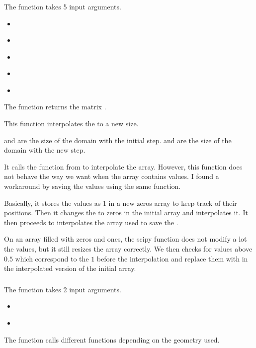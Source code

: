 \subsubsection{}
The function \textcolor{func}{} takes 5 input arguments.
\begin{itemize}
      \item {} \textcolor{dtype}{}
      \item {} \textcolor{dtype}{}
      \item {} \textcolor{dtype}{}
      \item {} \textcolor{dtype}{}
      \item {} \textcolor{dtype}{}
\end{itemize}
The function returns the matrix .

This function interpolates the  to a new size.

 and  are  the size of the domain with the initial
step.  and  are  the size of the domain with
the new step.

It calls the function  from  to interpolate
the array. However, this function does not behave the way we want when the
array contains  values. I found a workaround\cite{interp} by saving
the  values using the same function.

Basically, it stores the  values as 1 in a new zeros array to keep
track of their positions. Then it changes the  to zeros in the
initial array and interpolates it. It then proceeds to interpolates the array
used to save the .

On an array filled with zeros and ones, the scipy function does not modify a
lot the values, but it still resizes the array correctly. We then checks for
values above $0.5$ which correspond to the $1$ before the interpolation and
replace them with  in the interpolated version of the initial array.

\subsubsection{}
The function \textcolor{func}{} takes 2 input arguments.
\begin{itemize}
      \item {} \textcolor{dtype}{}
      \item {} \textcolor{dtype}{}
\end{itemize}
The function calls different functions depending on the geometry used.

